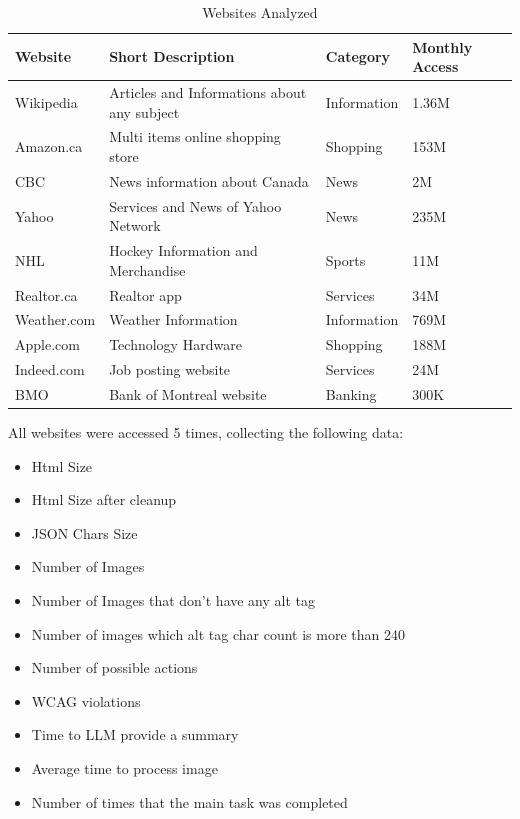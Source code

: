 \documentclass[conference]{IEEEtran}
\begin{document}
\begin{table}[h]
\centering
\caption{Websites Analyzed}
\label{tab:websites}
\small
\renewcommand{\arraystretch}{1.3}
\begin{tabular}{|>{\raggedright\arraybackslash}p{2.5cm}|>{\raggedright\arraybackslash}p{4cm}|>{\raggedright\arraybackslash}p{2.5cm}|>{\raggedright\arraybackslash}p{2.5cm}|}
\hline
\textbf{Website} & \textbf{Short Description} & \textbf{Category} & \textbf{Monthly Access} \\
\hline
Wikipedia & Articles and Informations about any subject & Information & 1.36M \\
\hline
Amazon.ca & Multi items online shopping store & Shopping & 153M \\
\hline
CBC & News information about Canada & News & 2M \\
\hline
Yahoo & Services and News of Yahoo Network & News & 235M \\
\hline
NHL & Hockey Information and Merchandise & Sports & 11M \\
\hline
Realtor.ca & Realtor app & Services & 34M \\
\hline
Weather.com & Weather Information & Information & 769M \\
\hline
Apple.com & Technology Hardware & Shopping & 188M \\
\hline
Indeed.com & Job posting website & Services & 24M \\
\hline
BMO & Bank of Montreal website & Banking & 300K \\
\hline
\end{tabular}
\end{table}

All websites were accessed 5 times, collecting the following data:
\begin{itemize}
    \item Html Size
    \item Html Size after cleanup 
    \item JSON Chars Size
    \item Number of Images
    \item Number of Images that don't have any alt tag
    \item Number of images which alt tag char count is more than 240
    \item Number of possible actions
    \item WCAG violations
    \item Time to LLM provide a summary
    \item Average time to process image
    \item Number of times that the main task was completed
\end{itemize}
\end{document}
